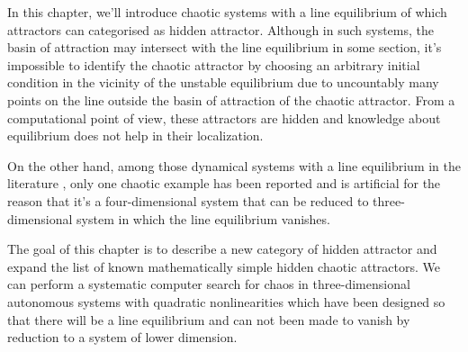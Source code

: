 In this chapter, we'll introduce chaotic systems with a line equilibrium of which attractors 
can categorised as hidden attractor.
Although in such systems, the basin of attraction may intersect with the line equilibrium  
in some section, it's impossible to identify the chaotic attractor by choosing an arbitrary initial 
condition in the vicinity of the unstable equilibrium due to uncountably many points on the line 
outside the basin of attraction of the chaotic attractor. From a computational point of view,
these attractors are hidden and knowledge about equilibrium does not help in their localization.

On the other hand, among those dynamical systems with a line equilibrium in the literature
\cite{MARCELO2012HOPF,Fiedler2000Generic,Fiedler2000Generic2,BERNOLD2012GENERIC},
only one chaotic example has been reported \cite{Zhou2013A} and is artificial for the reason that it's a four-dimensional
system that can be reduced to three-dimensional system in which the line equilibrium vanishes.

The goal of this chapter is to describe a new category of hidden attractor and expand the list of
known mathematically simple hidden chaotic attractors. We can perform a systematic computer
search for chaos in three-dimensional autonomous systems with quadratic nonlinearities which
have been designed so that there will be a line equilibrium and can not been made to vanish
by reduction to a system of lower dimension.

